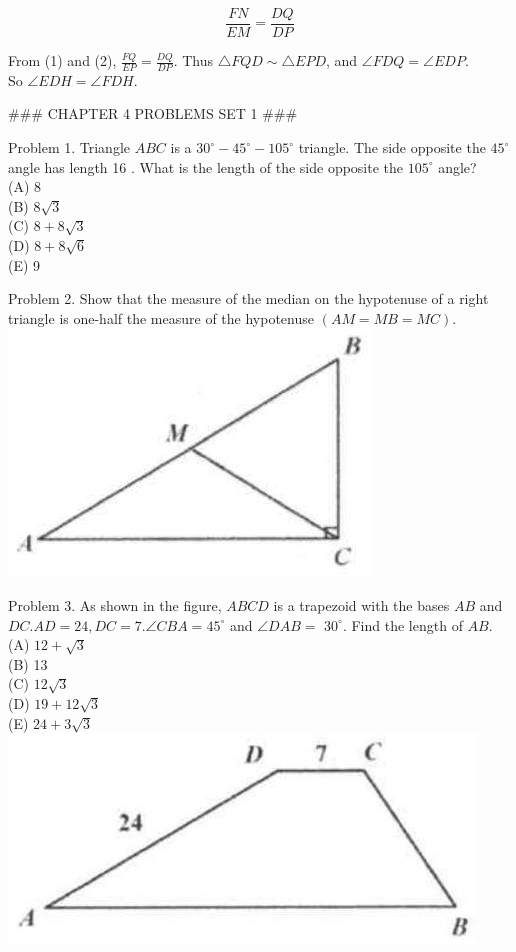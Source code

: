 \documentclass[10pt]{article}
\begin{document}
\[
\frac{F N}{E M}=\frac{D Q}{D P}
\]

From (1) and (2), \(\frac{F Q}{E P}=\frac{D Q}{D P}\). Thus \(\triangle F Q D \sim \triangle E P D\), and \(\angle F D Q=\angle E D P\).\\
So \(\angle E D H=\angle F D H\).


### CHAPTER 4 PROBLEMS SET 1 ###

Problem 1. Triangle \(A B C\) is a \(30^{\circ}-45^{\circ}-105^{\circ}\) triangle. The side opposite the \(45^{\circ}\) angle has length 16 . What is the length of the side opposite the \(105^{\circ}\) angle?\\
(A) 8\\
(B) \(8 \sqrt{3}\)\\
(C) \(8+8 \sqrt{3}\)\\
(D) \(8+8 \sqrt{6}\)\\
(E) 9

Problem 2. Show that the measure of the median on the hypotenuse of a right triangle is one-half the measure of the hypotenuse \((A M=M B=M C)\).\\
\includegraphics[max width=\textwidth, center]{2025_04_17_97bc1f7e44d93c271a88g-088(3)}

Problem 3. As shown in the figure, \(A B C D\) is a trapezoid with the bases \(A B\) and \(D C . A D=24, D C=7 . \angle C B A=45^{\circ}\) and \(\angle D A B=\) \(30^{\circ}\). Find the length of \(A B\).\\
(A) \(12+\sqrt{3}\)\\
(B) 13\\
(C) \(12 \sqrt{3}\)\\
(D) \(19+12 \sqrt{3}\)\\
(E) \(24+3 \sqrt{3}\)\\
\includegraphics[max width=\textwidth, center]{2025_04_17_97bc1f7e44d93c271a88g-088(1)}
\end{document}
